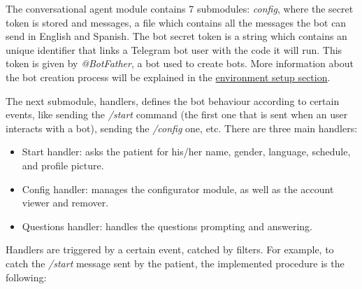\documentclass[12pt,english]{article}
\begin{document}
The conversational agent module contains 7 submodules: \emph{config}, where the secret token is stored and messages, a file which contains all the messages the bot can send in English and Spanish. The bot secret token is a string which contains an unique identifier that links a Telegram bot user with the code it will run. This token is given by \emph{@BotFather}, a bot used to create bots. More information about the bot creation process will be explained in the \hyperref[sec:env_setup]{environment setup section}.

The next submodule, handlers, defines the bot behaviour according to certain events, like sending the \emph{/start} command (the first one that is sent when an user interacts with a bot), sending the {\emph{/config}} one, etc. There are three main handlers:
\begin{itemize}
  \item Start handler: asks the patient for his/her name, gender, language, schedule, and profile picture.
  \item Config handler: manages the configurator module, as well as the account viewer and remover.
  \item Questions handler: handles the questions prompting and answering.
\end{itemize}

Handlers are triggered by a certain event, catched by filters. For example, to catch the \emph{/start} message sent by the patient, the implemented procedure is the following:
\end{document}

